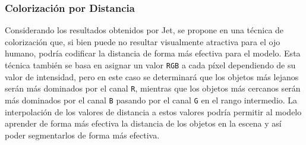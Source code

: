 \documentclass[12pt,a4paper]{report}
\begin{document}
\subsubsection{Colorización por Distancia}
Considerando los resultados obtenidos por Jet, se propone en una técnica de colorización que, si bien puede no resultar visualmente atractiva para el ojo humano, podría codificar la distancia de forma más efectiva para el modelo. Esta técnica también se basa en asignar un valor \texttt{RGB} a cada píxel dependiendo de su valor de intensidad, pero en este caso se determinará que los objetos más lejanos serán más dominados por el canal \texttt{R}, mientras que los objetos más cercanos serán más dominados por el canal \texttt{B} pasando por el canal \texttt{G} en el rango intermedio. La interpolación de los valores de distancia a estos valores podría permitir al modelo aprender de forma más efectiva la distancia de los objetos en la escena y así poder segmentarlos de forma más efectiva.
\end{document}
